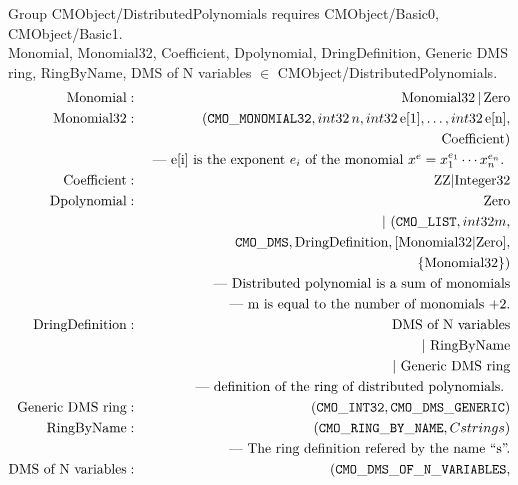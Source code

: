 \medbreak
\noindent
Group CMObject/DistributedPolynomials requires CMObject/Basic0,
CMObject/Basic1. \\
Monomial, Monomial32, Coefficient, Dpolynomial, DringDefinition,
Generic DMS ring, RingByName, DMS of N variables $\in$ 
CMObject/DistributedPolynomials. \\
\begin{eqnarray*}
\mbox{Monomial} &:& \mbox{Monomial32}\, |\, \mbox{Zero} \\
\mbox{Monomial32}&:& ({\tt CMO\_MONOMIAL32}, {\sl int32}\, n,
                      {\sl int32}\, \mbox{e[1]}, \ldots,
                      {\sl int32}\, \mbox{e[n]}, \\
                 & & \ \mbox{Coefficient}) \\
                 & & \mbox{ --- e[i] is the exponent $e_i$ of the monomial 
                      $x^e = x_1^{e_1} \cdots x_n^{e_n}$. } \\
\mbox{Coefficient}&:& \mbox{ZZ} | \mbox{Integer32} \\
\mbox{Dpolynomial}&:& \mbox{Zero} \\
                 & & |\ ({\tt CMO\_LIST},{\sl int32} m, \\
                 & & \ \ {\tt CMO\_DMS}, \mbox{DringDefinition},
                    [\mbox{Monomial32}|\mbox{Zero}], \\
                 & &\ \ 
                    \{\mbox{Monomial32}\})  \\
                 & &\mbox{--- Distributed polynomial is a sum of monomials}\\
                 & &\mbox{--- m is equal to the number of monomials $+2$.}\\
\mbox{DringDefinition}
                 &:& \mbox{DMS of N variables} \\
                 & & |\ \mbox{RingByName} \\
                 & & |\ \mbox{Generic DMS ring} \\
                 & & \mbox{ --- definition of the ring of distributed polynomials. } \\
\mbox{Generic DMS ring}
                 &:& ({\tt CMO\_INT32, CMO\_DMS\_GENERIC}) \\
\mbox{RingByName}&:& ({\tt CMO\_RING\_BY\_NAME}, {\sl Cstring} s) \\
                 & & \mbox{ --- The ring definition refered by the name ``s''.} \\
\mbox{DMS of N variables}
                 &:& ({\tt CMO\_DMS\_OF\_N\_VARIABLES}, \\

\end{eqnarray*}
